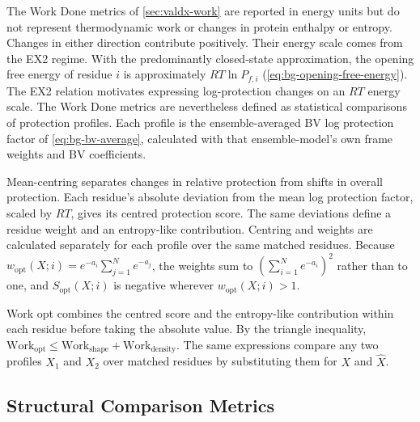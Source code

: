 The Work Done metrics of \cref{sec:valdx-work} are reported in energy units but do not represent thermodynamic work or changes in protein enthalpy or entropy. Changes in either direction contribute positively. Their energy scale comes from the EX2 regime. With the predominantly closed-state approximation, the opening free energy of residue $i$ is approximately $RT\ln P_{f,i}$ (\cref{eq:bg-opening-free-energy}). The EX2 relation motivates expressing log-protection changes on an $RT$ energy scale. The Work Done metrics are nevertheless defined as statistical comparisons of protection profiles. Each profile is the ensemble-averaged BV log protection factor of \cref{eq:bg-bv-average}, calculated with that ensemble-model's own frame weights and BV coefficients.

Mean-centring separates changes in relative protection from shifts in overall protection. Each residue's absolute deviation from the mean log protection factor, scaled by $RT$, gives its centred protection score. The same deviations define a residue weight and an entropy-like contribution. Centring and weights are calculated separately for each profile over the same matched residues. Because $w_\text{opt}(X;i)=e^{-a_i}\sum_{j=1}^{N}e^{-a_j}$, the weights sum to $\left(\sum_{i=1}^{N}e^{-a_i}\right)^2$ rather than to one, and $S_\text{opt}(X;i)$ is negative wherever $w_\text{opt}(X;i)>1$.

Work opt combines the centred score and the entropy-like contribution within each residue before taking the absolute value. By the triangle inequality, $\text{Work}_\text{opt}\le\text{Work}_\text{shape}+\text{Work}_\text{density}$. The same expressions compare any two profiles $X_1$ and $X_2$ over matched residues by substituting them for $X$ and $\hat X$.

\subsection{Structural Comparison Metrics}
\label{app:valdx-structural-metrics}

